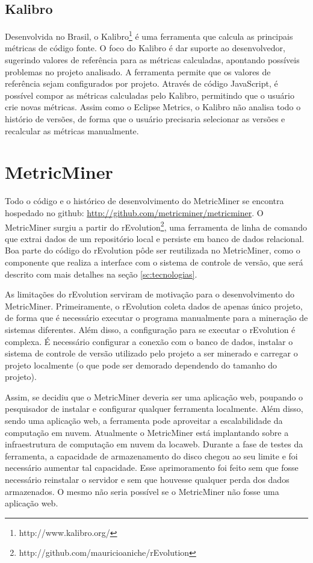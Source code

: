 \documentclass[a4paper, 12pt, twoside]{book}
\begin{document}
\section{Kalibro}
    Desenvolvida no Brasil, o Kalibro\footnote{http://www.kalibro.org/} é uma ferramenta que calcula as principais métricas de código fonte. O foco do Kalibro é dar suporte ao desenvolvedor, sugerindo valores de referência para as métricas calculadas, apontando possíveis problemas no projeto analisado. A ferramenta permite que os valores de referência sejam configurados por projeto. Através de código JavaScript, é possível compor as métricas calculadas pelo Kalibro, permitindo que o usuário crie novas métricas. Assim como o Eclipse Metrics, o Kalibro não analisa todo o histório de versões, de forma que o usuário precisaria selecionar as versões e recalcular as métricas manualmente.
    
\chapter{MetricMiner} \label{ch:arquitetura}

    Todo o código e o histórico de desenvolvimento do MetricMiner se encontra hospedado no github: \url{http://github.com/metricminer/metricminer}. O MetricMiner surgiu a partir do rEvolution\footnote{http://github.com/mauricioaniche/rEvolution}, uma ferramenta de linha de comando que extrai dados de um repositório local e persiste em banco de dados  relacional. Boa parte do código do rEvolution pôde ser reutilizada no MetricMiner, como o componente que realiza a interface com o sistema de controle de versão, que será descrito com mais detalhes na seção \ref{sc:tecnologias}.

    As limitações do rEvolution serviram de motivação para o desenvolvimento do MetricMiner. Primeiramente, o rEvolution coleta dados de apenas único projeto, de forma que é necessário executar o programa manualmente para a mineração de sistemas diferentes. Além disso, a configuração para se executar o rEvolution é complexa. É necessário configurar a conexão com o banco de dados, instalar o sistema de controle de versão utilizado pelo projeto a ser minerado e carregar o projeto localmente (o que pode ser demorado dependendo do tamanho do projeto). 

    Assim, se decidiu que o MetricMiner deveria ser uma aplicação web, poupando o pesquisador de instalar e configurar qualquer ferramenta localmente. Além disso, sendo uma aplicação web, a ferramenta pode aproveitar a escalabilidade da computação em nuvem. Atualmente o MetricMiner está implantando sobre a infraestrutura de computação em nuvem da locaweb. Durante a fase de testes da ferramenta, a capacidade de armazenamento do disco chegou ao seu limite e foi necessário aumentar tal capacidade. Esse aprimoramento foi feito sem que fosse necessário reinstalar o servidor e sem que houvesse qualquer perda dos dados armazenados. O mesmo não seria possível se o MetricMiner não fosse uma aplicação web.
\end{document}
